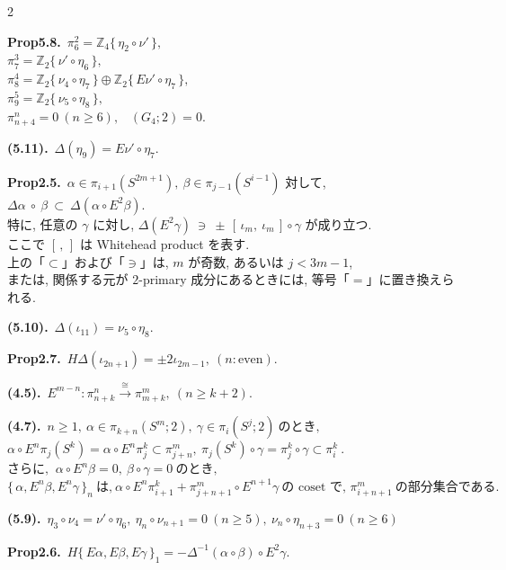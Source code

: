 \documentclass[10pt, leqno]{ltjsarticle}
\newcommand{\todai}[2][]{\{\,#2\,\}_{#1}}      %
\newcommand{\gen}[1]{\{\,#1\,\}}       %
\newcommand{\pis}[2]{\pi_{#1}(#2)}       %
\newcommand{\pit}[2]{\pi_{#1}^{#2}}
\numberwithin{equation}{section}
\theoremstyle{plain}
\theoremstyle{definition}
\theoremstyle{remark}
\begin{document}
\begin{paracol}{2}
\switchcolumn

\noindent
\textbf{Prop5.8.}\
\(\pi^{2}_{6}=\mathbb Z_4\gen{\eta_{2}\circ\nu'},\) \\
\(\pi^{3}_{7}=\mathbb Z_2\gen{\nu'\circ\eta_6},\) \\
\(\pi^{4}_{8}=\mathbb Z_2\gen{\nu_{4}\circ\eta_7}\oplus \mathbb Z_2\gen{E\nu'\circ\eta_7},\) \\
\(\pi^{5}_{9}=\mathbb Z_2\gen{\nu_{5}\circ\eta_8},\) \\
\(\pi^{n}_{n+4}=0\ (n\ge6),\) \
\((G_{4};2)=0.\)

\noindent
\textbf{(5.11).}\
\(\Delta(\eta_9)=E\nu'\circ\eta_7 .\)

\noindent
\textbf{Prop2.5.}\
$\alpha\in\pi_{i+1}(S^{2m+1}), \ \beta\in \pi_{j-1}(S^{i-1})$ 対して, 
\(
\Delta\alpha\ \circ\ \beta\ \subset\ \Delta(\alpha\circ E^2\beta).
\)\\
特に, 任意の $\gamma$ に対し,
\(
\Delta(E^2\gamma)\ \ni\ \pm\,[\,\iota_m,\ \iota_m\,]\circ\gamma
\)
が成り立つ. \\
ここで $[\, ,\,]$ は Whitehead product を表す. \\
上の「$\subset$」および「$\ni$」は, $m$ が奇数, 
あるいは $j<3m-1$, \\
または, 関係する元が \(2\)-primary 成分にあるときには, 
等号「$=$」に置き換えられる. 

\noindent
\textbf{(5.10).}\
\(\Delta(\iota_{11})=\nu_5\circ\eta_8 .\)

\noindent
\textbf{Prop2.7.}\
\(H\Delta(\iota_{2n+1}) = \pm2\iota_{2m-1},\ (n:\text{even})\).

\noindent
\textbf{(4.5).}\
\(E^{m-n}:\pit{n+k}{n}\xrightarrow{\cong}\pit{m+k}{m},\
(n\ge k+2). \)

\noindent
\textbf{(4.7).}\
\(n\ge1, \ \alpha\in\pis{k+n}{S^m; 2},\ \gamma\in\pis{i}{S^j; 2}
    \ \text{のとき, }\)\\
\(\alpha\circ E^n\pis{j}{S^k} = \alpha\circ E^n \pit{j}{k}
  \subset \pit{j+n}{m},
  \ \pis{j}{S^k}\circ\gamma = \pit{j}{k}\circ\gamma \subset\pit{i}{k}\ . \)\\
\(\text{さらに, }\ \alpha\circ E^n\beta=0,\ \beta\circ\gamma = 0 \ \text{のとき, }\)\\
\(\todai[n]{\alpha, E^n\beta, E^n\gamma}\ \text{は,}\
  \alpha\circ E^n\pit{i+1}{k} + \pit{j+n+1}{m}\circ E^{n+1}\gamma\
  \text{の coset で, }\pit{i+n+1}{m} \ \text{の部分集合である. }\)

\noindent
\textbf{(5.9).}\
\(\eta_3\circ \nu_4= \nu'\circ \eta_6,\
\eta_n\circ \nu_{n+1}=0\ (n\ge5),\
\nu_n\circ \eta_{n+3}=0\ (n\ge6)\)

\noindent
\textbf{Prop2.6.}\
\(H\todai[1]{E\alpha, E\beta, E\gamma} 
= -\Delta^{-1}(\alpha\circ\beta)\circ E^2\gamma.\)




\end{paracol}
\end{document}
